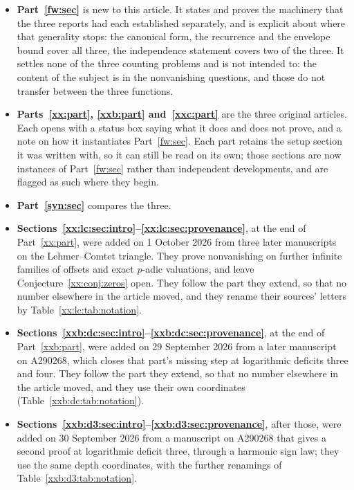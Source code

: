 \documentclass[11pt,a4paper]{article}
\numberwithin{equation}{section}
\theoremstyle{definition}
\theoremstyle{remark}
\theoremstyle{plain}
\begin{document}
\begin{itemize}[leftmargin=1.6em,itemsep=2pt]
\item \textbf{Part~\ref{fw:sec}} is new to this article.  It states and proves
 the machinery that the three reports had each established separately, and is
 explicit about where that generality stops: the canonical form, the recurrence
 and the envelope bound cover all three, the independence statement covers two
 of the three.  It settles none of the
 three counting problems and is not intended to: the content of the subject is
 in the nonvanishing questions, and those do not transfer between the three
 functions.
\item \textbf{Parts~\ref{xx:part}, \ref{xxb:part} and~\ref{xxc:part}} are the
 three original articles.  Each opens with a status box saying what it does and
 does not prove, and a note on how it instantiates Part~\ref{fw:sec}.  Each part
 retains the setup section it was written with, so it can still be read on its
 own; those sections are now instances of Part~\ref{fw:sec} rather than
 independent developments, and are flagged as such where they begin.
\item \textbf{Part~\ref{syn:sec}} compares the three.
\item \textbf{Sections~\ref{xx:lc:sec:intro}--\ref{xx:lc:sec:provenance}}, at
 the end of Part~\ref{xx:part}, were added on 1 October 2026 from three later
 manuscripts on the Lehmer--Comtet triangle.  They prove nonvanishing on
 further infinite families of offsets and exact $p$-adic valuations, and leave
 Conjecture~\ref{xx:conj:zeros} open.  They follow the part they extend, so
 that no number elsewhere in the article moved, and they rename their sources'
 letters by Table~\ref{xx:lc:tab:notation}.
\item \textbf{Sections~\ref{xxb:dc:sec:intro}--\ref{xxb:dc:sec:provenance}}, at
 the end of Part~\ref{xxb:part}, were added on 29 September 2026 from a later
 manuscript on A290268, which closes that part's missing step at logarithmic
 deficits three and four.  They follow the part they extend, so that no number
 elsewhere in the article moved, and they use their own coordinates
 (Table~\ref{xxb:dc:tab:notation}).
\item \textbf{Sections~\ref{xxb:d3:sec:intro}--\ref{xxb:d3:sec:provenance}},
 after those, were added on 30 September 2026 from a manuscript on A290268
 that gives a second proof at logarithmic deficit three, through a harmonic
 sign law; they use the same depth coordinates, with the further renamings of
 Table~\ref{xxb:d3:tab:notation}.

\end{itemize}
\end{document}
